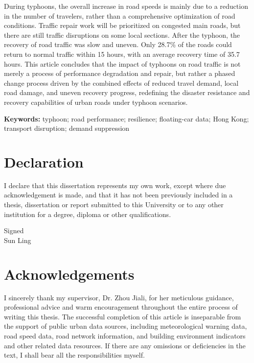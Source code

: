 \documentclass[12pt,a4paper]{report}
\begin{document}
During typhoons, the overall increase in road speeds is mainly due to a reduction in the number of travelers, rather than a comprehensive optimization of road conditions. Traffic repair work will be prioritized on congested main roads, but there are still traffic disruptions on some local sections. After the typhoon, the recovery of road traffic was slow and uneven. Only 28.7\% of the roads could return to normal traffic within 15 hours, with an average recovery time of 35.7 hours. This article concludes that the impact of typhoons on road traffic is not merely a process of performance degradation and repair, but rather a phased change process driven by the combined effects of reduced travel demand, local road damage, and uneven recovery progress, redefining the disaster resistance and recovery capabilities of urban roads under typhoon scenarios.

\textbf{Keywords:} typhoon; road performance; resilience; floating-car data; Hong Kong; transport disruption; demand suppression

\chapter*{Declaration}
I declare that this dissertation represents my own work, except where due acknowledgement is made, and that it has not been previously included in a thesis, dissertation or report submitted to this University or to any other institution for a degree, diploma or other qualifications.

\vspace{2cm}
\noindent Signed\\[1.2cm]
Sun Ling

\chapter*{Acknowledgements}
I sincerely thank my supervisor, Dr. Zhou Jiali, for her meticulous guidance, professional advice and warm encouragement throughout the entire process of writing this thesis. The successful completion of this article is inseparable from the support of public urban data sources, including meteorological warning data, road speed data, road network information, and building environment indicators and other related data resources. If there are any omissions or deficiencies in the text, I shall bear all the responsibilities myself.
\end{document}

